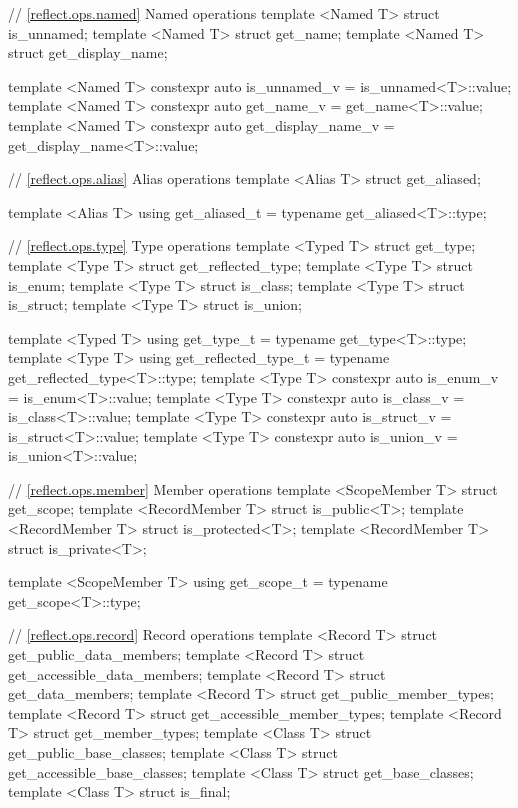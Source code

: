 \begin{std.txt}
\begin{codeblock}
{{// \ref{reflect.ops.named} Named operations
template <Named T> struct is_unnamed;
template <Named T> struct get_name;
template <Named T> struct get_display_name;

template <Named T>
  constexpr auto is_unnamed_v = is_unnamed<T>::value;
template <Named T>
  constexpr auto get_name_v = get_name<T>::value;
template <Named T>
  constexpr auto get_display_name_v = get_display_name<T>::value;

// \ref{reflect.ops.alias} Alias operations
template <Alias T> struct get_aliased;

template <Alias T>
  using get_aliased_t = typename get_aliased<T>::type;

// \ref{reflect.ops.type} Type operations
template <Typed T> struct get_type;
template <Type T> struct get_reflected_type;
template <Type T> struct is_enum;
template <Type T> struct is_class;
template <Type T> struct is_struct;
template <Type T> struct is_union;

template <Typed T>
  using get_type_t = typename get_type<T>::type;
template <Type T>
  using get_reflected_type_t = typename get_reflected_type<T>::type;
template <Type T>
  constexpr auto is_enum_v = is_enum<T>::value;
template <Type T>
  constexpr auto is_class_v = is_class<T>::value;
template <Type T>
  constexpr auto is_struct_v = is_struct<T>::value;
template <Type T>
  constexpr auto is_union_v = is_union<T>::value;

// \ref{reflect.ops.member} Member operations
template <ScopeMember T> struct get_scope;
template <RecordMember T> struct is_public<T>;
template <RecordMember T> struct is_protected<T>;
template <RecordMember T> struct is_private<T>;

template <ScopeMember T>
  using get_scope_t = typename get_scope<T>::type;

// \ref{reflect.ops.record} Record operations
template <Record T> struct get_public_data_members;
template <Record T> struct get_accessible_data_members;
template <Record T> struct get_data_members;
template <Record T> struct get_public_member_types;
template <Record T> struct get_accessible_member_types;
template <Record T> struct get_member_types;
template <Class T> struct get_public_base_classes;
template <Class T> struct get_accessible_base_classes;
template <Class T> struct get_base_classes;
template <Class T> struct is_final;

}}
\end{codeblock}
\end{std.txt}
